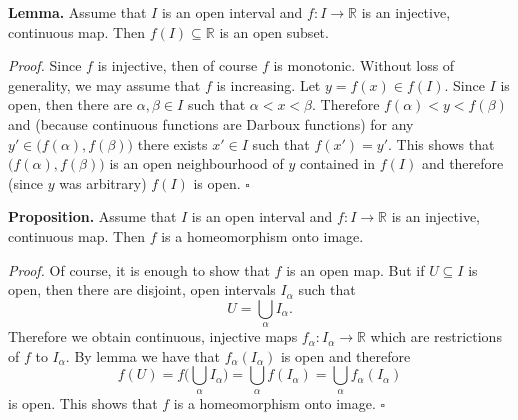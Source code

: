 \documentclass[12pt]{article}
\begin{document}
\textbf{Lemma.} Assume that $I$ is an open interval and $f:I\to\mathbb{R}$ is an injective, continuous map. Then $f(I)\subseteq\mathbb{R}$ is an open subset.

\textit{Proof.} Since $f$ is injective, then of course $f$ is monotonic. Without loss of generality, we may assume that $f$ is increasing. Let $y=f(x)\in f(I)$. Since $I$ is open, then there are $\alpha,\beta\in I$ such that $\alpha<x<\beta$. Therefore $f(\alpha)<y<f(\beta)$ and (because continuous functions are Darboux functions) for any $y'\in \big(f(\alpha),f(\beta)\big)$ there exists $x'\in I$ such that $f(x')=y'$. This shows that $\big(f(\alpha),f(\beta)\big)$ is an open neighbourhood of $y$ contained in $f(I)$ and therefore (since $y$ was arbitrary) $f(I)$ is open. $\square$

\textbf{Proposition.} Assume that $I$ is an open interval and $f:I\to\mathbb{R}$ is an injective, continuous map. Then $f$ is a homeomorphism onto image.

\textit{Proof.} Of course, it is enough to show that $f$ is an open map. But if $U\subseteq I$ is open, then there are disjoint, open intervals $I_{\alpha}$ such that $$U=\bigcup_{\alpha} I_{\alpha}.$$ Therefore we obtain continuous, injective maps $f_{\alpha}:I_{\alpha}\to\mathbb{R}$ which are restrictions of $f$ to $I_{\alpha}$. By lemma we have that $f_{\alpha}(I_{\alpha})$ is open and therefore
$$f(U)=f\bigg(\bigcup_{\alpha}I_{\alpha}\bigg)=\bigcup_{\alpha}f(I_{\alpha})=\bigcup_{\alpha}f_{\alpha}(I_{\alpha})$$
is open. This shows that $f$ is a homeomorphism onto image. $\square$
\end{document}
